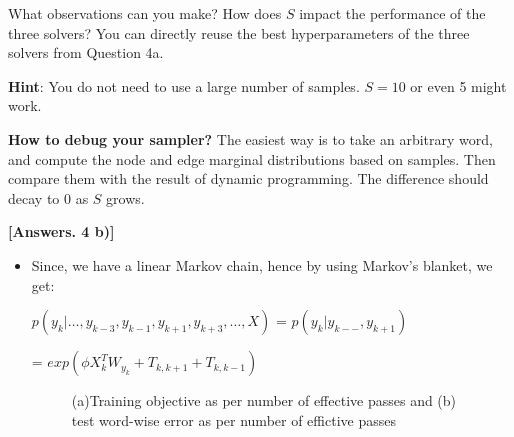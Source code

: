 \documentclass[11pt]{report}
\begin{document}
\begin{itemize}
	
	What observations can you make?  How does $S$ impact the performance of the three solvers?
	You can directly reuse the best hyperparameters of the three solvers from Question 4a.
		
	\textbf{Hint}: You do not need to use a large number of samples.  $S=10$ or even 5 might work.
	
	\textbf{How to debug your sampler?} The easiest way is to take an arbitrary word, and compute the node and edge marginal distributions based on samples.  Then compare them with the result of dynamic programming.  The difference should decay to 0 as $S$ grows.
	    	
    {\bf [Answers. 4 b)]} 
	\begin{itemize}[i)]
	    \item Since, we have a linear Markov chain, hence by using Markov's blanket, we get: 
	    
	    $p(y_k|\ldots, y_{k-3}, y_{k-1}, y_{k+1}, y_{k+3}, \ldots, X)$ = $p(y_k| y_{k--}, y_{k+1})$
	    
	    = $exp(\phi X_k^T W_{y_k}+T_{k,k+1}+T_{k,k-1})$
	    
	    	\begin{figure}[H]
            	\centering
            	\caption{(a)Training objective as per number of effective passes and (b) test word-wise error as per number of effictive passes}
            	\label{fig:compare_optimizer}
            \end{figure}
	\end{itemize}
	

\end{itemize}
\end{document}
